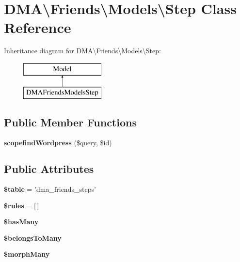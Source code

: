 \hypertarget{classDMA_1_1Friends_1_1Models_1_1Step}{\section{D\-M\-A\textbackslash{}Friends\textbackslash{}Models\textbackslash{}Step Class Reference}
\label{classDMA_1_1Friends_1_1Models_1_1Step}
}
Inheritance diagram for D\-M\-A\textbackslash{}Friends\textbackslash{}Models\textbackslash{}Step\-:\begin{figure}[H]
\begin{center}
\leavevmode
\includegraphics[height=2.000000cm]{d9/d03/classDMA_1_1Friends_1_1Models_1_1Step}
\end{center}
\end{figure}
\subsection*{Public Member Functions}
\begin{DoxyCompactItemize}
\item 
\hypertarget{classDMA_1_1Friends_1_1Models_1_1Step_a58a71b1c9b39249ac24484bbd2307db2}{{\bfseries scopefind\-Wordpress} (\$query, \$id)}\label{classDMA_1_1Friends_1_1Models_1_1Step_a58a71b1c9b39249ac24484bbd2307db2}

\end{DoxyCompactItemize}
\subsection*{Public Attributes}
\begin{DoxyCompactItemize}
\item 
\hypertarget{classDMA_1_1Friends_1_1Models_1_1Step_a73a0d48cb46b1aeeaad83499e8449acc}{{\bfseries \$table} = 'dma\-\_\-friends\-\_\-steps'}\label{classDMA_1_1Friends_1_1Models_1_1Step_a73a0d48cb46b1aeeaad83499e8449acc}

\item 
\hypertarget{classDMA_1_1Friends_1_1Models_1_1Step_a13476d5ca718080b85c9633270bf4942}{{\bfseries \$rules} = \mbox{[}$\,$\mbox{]}}\label{classDMA_1_1Friends_1_1Models_1_1Step_a13476d5ca718080b85c9633270bf4942}

\item 
{\bfseries \$has\-Many}
\item 
{\bfseries \$belongs\-To\-Many}
\item 
{\bfseries \$morph\-Many}
\end{DoxyCompactItemize}
